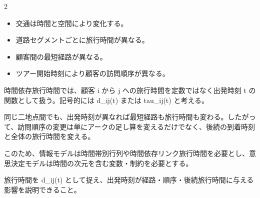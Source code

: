

\vspace{1.5mm}

\begin{multicols}{2}

\footnotesize

\raggedcolumns


\begin{itemize}
\item 交通は時間と空間により変化する。
\item 道路セグメントごとに旅行時間が異なる。
\item 顧客間の最短経路が異なる。
\item ツアー開始時刻により顧客の訪問順序が異なる。
\end{itemize}

時間依存旅行時間では、顧客 i から j への旅行時間を定数ではなく出発時刻 t の関数として扱う。記号的には d\_ij(t) または tau\_ij(t) と考える。\par

同じ二地点間でも、出発時刻が異なれば最短経路も旅行時間も変わる。したがって、訪問順序の変更は単にアークの足し算を変えるだけでなく、後続の到着時刻と全体の旅行時間を変える。\par

このため、情報モデルは時間帯別行列や時間依存リンク旅行時間を必要とし、意思決定モデルは時間の次元を含む変数・制約を必要とする。\par

旅行時間を d\_ij(t) として捉え、出発時刻が経路・順序・後続旅行時間に与える影響を説明できること。\par


\end{multicols}
